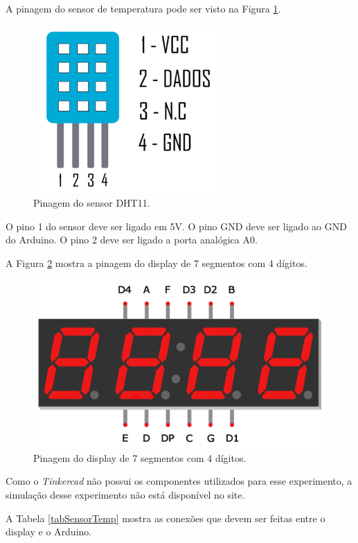 \documentclass[12pt]{article}
\begin{document}
A pinagem do sensor de temperatura pode ser visto na Figura \ref{figDHT11}.

\begin{figure}[H]
	\centering
	\includegraphics[scale=0.5]{Imagens/Experimentos/12-SensorTemperatura/dht11.png}
	\caption{Pinagem do sensor DHT11.}
	\label{figDHT11}
\end{figure}

O pino 1 do sensor deve ser ligado em 5V. O pino GND deve ser ligado ao GND do Arduino. O pino 2 deve ser ligado a porta analógica A0.

A Figura \ref{fig7seg4dig} mostra a pinagem do display de 7 segmentos com 4 dígitos.

\begin{figure}[H]
	\centering
	\includegraphics[scale=0.15]{Imagens/Experimentos/12-SensorTemperatura/7seg.png}
	\caption{Pinagem do display de 7 segmentos com 4 dígitos.}
	\label{fig7seg4dig}
\end{figure}

Como o \textit{Tinkercad} não possui os componentes utilizados para esse experimento, a simulação desse experimento não está disponível no site.

A Tabela \ref{tabSensorTemp} mostra as conexões que devem ser feitas entre o display e o Arduino.
\end{document}
